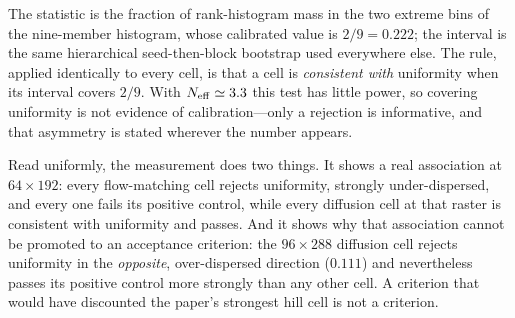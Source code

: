 \documentclass[11pt]{article}
\begin{document}
The statistic is the fraction of rank-histogram mass in the two extreme bins of the nine-member
histogram, whose calibrated value is $2/9=0.222$; the interval is the same hierarchical
seed-then-block bootstrap used everywhere else. The rule, applied identically to every cell, is
that a cell is \emph{consistent with} uniformity when its interval covers $2/9$. With
$N_{\rm eff}\simeq3.3$ this test has little power, so covering uniformity is not evidence of
calibration---only a rejection is informative, and that asymmetry is stated wherever the number
appears.

Read uniformly, the measurement does two things. It shows a real association at $64\times192$:
every flow-matching cell rejects uniformity, strongly under-dispersed, and every one fails its
positive control, while every diffusion cell at that raster is consistent with uniformity and
passes. And it shows why that association cannot be promoted to an acceptance criterion: the $96\times288$
diffusion cell rejects uniformity in the \emph{opposite}, over-dispersed direction ($0.111$) and
nevertheless passes its positive control more strongly than any other cell. A criterion that
would have discounted the paper's strongest hill cell is not a criterion.
\end{document}
